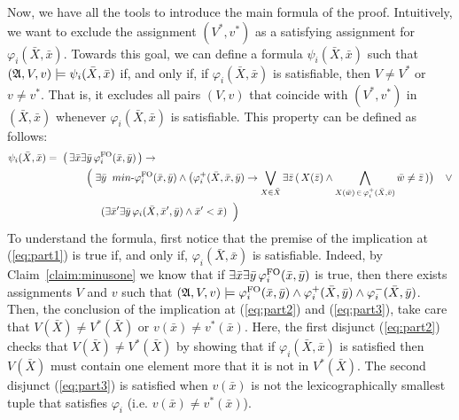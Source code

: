Now, we have all the tools to introduce the main formula of the proof. 
Intuitively, we want to exclude the assignment $(V^*, v^*)$ as a satisfying assignment for $\varphi_i(\bar{X},\bar{x})$.
Towards this goal, we can define a formula $\psi_i(\bar{X},\bar{x})$ such that $(\mathfrak{A}, V, v) \models \psi_i(\bar{X},\bar{x})$ if, and only if, 
if $\varphi_i(\bar{X}, \bar{x})$ is satisfiable, then $V \neq V^*$ or $v \neq v^*$. 
That is, it excludes all pairs $(V, v)$ that coincide with $(V^*, v^*)$ in $(\bar{X}, \bar{x})$ whenever $\varphi_i(\bar{X}, \bar{x})$ is satisfiable. This property can be defined as follows:
\begin{align}
\psi_i(\bar{X},\bar{x}) = & \;\; \big( \, \exists\bar{x}\exists\bar{y}\, \varphi^{\fo}_i(\bar{x},\bar{y}) \,\big) \rightarrow  \label{eq:part1} \\
& \hspace{1cm} \Big( \; 
\exists\bar{y} \;\; \text{$min$-}\varphi^{\fo}_i(\bar{x}, \bar{y}) \wedge \big( \varphi_i^+(\bar{X},\bar{x}, \bar{y})  \rightarrow \bigvee_{X \in \bar{X}} \exists\bar{z}\, ( \, X(\bar{z}) \wedge \bigwedge\limits_{X(\bar{w}) \, \in \, \varphi^{+}_i(\bar{X},\bar{v})}\bar{w}\neq\bar{z} \, ) \big)  \;\;\;\;  \vee   \label{eq:part2} \\ 
& \hspace{1.5cm} (\exists\bar{x}'\exists\bar{y}\, \varphi_i(\bar{X},\bar{x}',\bar{y})\wedge \bar{x}' < \bar{x}) \;\; \Big)  \label{eq:part3}
\end{align}
To understand the formula, first notice that the premise of the implication at (\ref{eq:part1}) is true if, and only if, $\varphi_i(\bar{X}, \bar{x})$ is satisfiable. 
Indeed, by Claim~\ref{claim:minusone} we know that if $\exists\bar{x}\exists\bar{y}\, \varphi^{{\rm FO}}_i(\bar{x},\bar{y})$ is true, then there exists assignments $V$ and $v$ such that $(\mathfrak{A},V,v) \models\varphi^{{\rm FO}}_i(\bar{x},\bar{y}) \wedge \varphi^{+}_i(\bar{X}, \bar{y}) \wedge \varphi^{-}_i(\bar{X},\bar{y})$.
Then, the conclusion of the implication at (\ref{eq:part2}) and (\ref{eq:part3}), take care that $V(\bar{X}) \neq V^*(\bar{X})$ or $v(\bar{x}) \neq v^*(\bar{x})$.
Here, the first disjunct (\ref{eq:part2}) checks that $V(\bar{X}) \neq V^*(\bar{X})$ by showing that if $\varphi_i(\bar{X},\bar{x})$ is satisfied then $V(\bar{X})$ must contain one element more that it is not in $V^*(\bar{X})$. 
The second disjunct (\ref{eq:part3}) is satisfied when $v(\bar{x})$ is not the lexicographically smallest tuple that satisfies $\varphi_i$ (i.e. $v(\bar{x}) \neq v^*(\bar{x})$).

